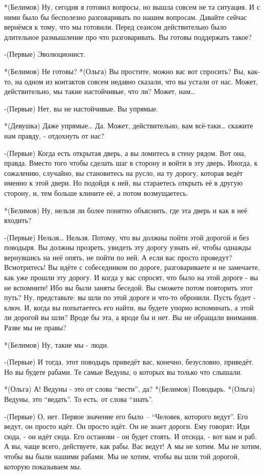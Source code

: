 *(Белимов) Ну, сегодня я готовил вопросы, но вышла совсем не та ситуация. И с ними было бы бесполезно разговаривать по нашим вопросам. Давайте сейчас вернёмся к тому, что мы готовили. Перед сеансом действительно было длительное размышление  про что разговаривать. Вы готовы поддержать такое?

-(Первые) Эволюционист.

*(Белимов) Не готовы?
*(Ольга) Вы простите, можно вас вот спросить? Вы, как-то, на одном из контактов совсем недавно сказали, что вы устали от нас. Может, действительно, мы такие настойчивые, что ли? Может, нам…

-(Первые) Нет, вы не настойчивые. Вы упрямые.

*(Девушка) Даже упрямые… Да. Может, действительно, вам всё-таки… скажите нам правду, - отдохнуть от нас?

-(Первые) Когда есть открытая дверь, а вы ломитесь в стену рядом. Вот она, правда. Вместо того чтобы сделать шаг в сторону и войти в эту дверь. Иногда, к сожалению, случайно, вы становитесь на русло,  на ту дорогу, которая ведёт именно к этой двери. Но подойдя к ней, вы стараетесь открыть её в другую сторону, и, тем больше клините её, а потом возмущаетесь.

*(Белимов) Ну, нельзя ли более понятно объяснить, где эта дверь и как в неё входить?

-(Первые) Нельзя… Нельзя. Потому, что вы должны пойти этой дорогой  и без поводыря. Вы должны прозреть, увидеть эту дорогу узнать её, чтобы однажды вернувшись на неё опять, не пойти по ней. А если вас просто проведут? Всмотритесь! Вы идёте с собеседником по дороге, разговариваете и не замечаете, как уже прошли эту дорогу. И когда у вас спросят, что было на этой дороге - вы не вспомните! Ибо вы были заняты беседой. Вы сможете потом повторить этот путь? Ну, представьте: вы шли по этой дороге и что-то обронили.  Пусть будет - ключ. И, когда вы попытаетесь его найти, вы будете упорно вспоминать, а этой ли дорогой вы шли? Вроде бы эта, а вроде бы и нет. Вы не обращали внимания. Разве мы не правы?

*(Белимов) Ну, такие мы - люди.

-(Первые) И тогда, этот поводырь  приведёт вас, конечно, безусловно, приведёт. Но вы будете рабами. Те самые Ведуны, о которых вы только что слышали.

*(Ольга) А! Ведуны - это от слова “вести”, да?
*(Белимов) Поводырь.
*(Ольга) Ведуны, это “ведать”. То есть, от слова “знать”.

-(Первые) О, нет. Первое значение его было – “Человек, которого ведут”. Его ведут, он  просто идёт. Он просто идёт. Он не знает дороги. Ему говорят: Иди сюда, - он идёт сюда. Его останови -  он будет стоять. И отсюда, - вот вам и раб. А вы, чаще всего, действуете, как рабы. Вас ведут! А мы не хотим. Мы не хотим, чтобы вы были нашими рабами. Мы не хотим, чтобы вы шли той дорогой, которую показываем мы.

